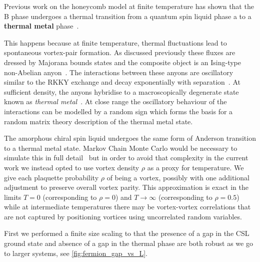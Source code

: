 Previous work on the honeycomb model at finite temperature has shown that the B phase undergoes a thermal transition from a quantum spin liquid phase a to a \textbf{thermal metal} phase~\autocite{selfThermallyInducedMetallic2019}.

This happens because at finite temperature, thermal fluctuations lead to spontaneous vortex-pair formation. As discussed previously these fluxes are dressed by Majorana bounds states and the composite object is an Ising-type non-Abelian anyon~\autocite{Beenakker2013}. The interactions between these anyons are oscillatory similar to the RKKY exchange and decay exponentially with separation~\autocite{Laumann2012,Lahtinen_2011,lahtinenTopologicalLiquidNucleation2012}. At sufficient density, the anyons hybridise to a macroscopically degenerate state known as \emph{thermal metal}~\autocite{Laumann2012}. At close range the oscillatory behaviour of the interactions can be modelled by a random sign which forms the basis for a random matrix theory description of the thermal metal state.

The amorphous chiral spin liquid undergoes the same form of Anderson transition to a thermal metal state. Markov Chain Monte Carlo would be necessary to simulate this in full detail~\autocite{selfThermallyInducedMetallic2019} but in order to avoid that complexity in the current work we instead opted to use vortex density \(\rho\) as a proxy for temperature. We give each plaquette probability \(\rho\) of being a vortex, possibly with one additional adjustment to preserve overall vortex parity. This approximation is exact in the limits \(T = 0\) (corresponding to \(\rho = 0\)) and \(T \to \infty\) (corresponding to \(\rho = 0.5\)) while at intermediate temperatures there may be vortex-vortex correlations that are not captured by positioning vortices using uncorrelated random variables.

First we performed a finite size scaling to that the presence of a gap in the CSL ground state and absence of a gap in the thermal phase are both robust as we go to larger systems, see \cref{fig:fermion_gap_vs_L}.

